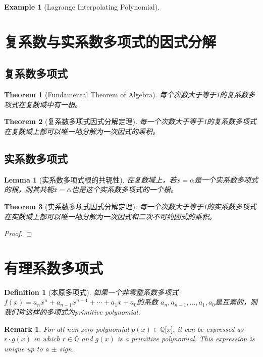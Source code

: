 \documentclass[onecolumn]{ctexart}
\newtheorem{definition}{Definition}
\newtheorem{theorem}{Theorem}
\newtheorem{lemma}{Lemma}
\newtheorem{remark}{Remark}
\newtheorem{example}{Example}
\begin{document}
\begin{example}[Lagrange Interpolating Polynomial]
  
\end{example}

\section{复系数与实系数多项式的因式分解}

\subsection{复系数多项式}

\begin{theorem}[Fundamental Theorem of Algebra]
  每个次数大于等于1的复系数多项式在复数域中有一根。
\end{theorem}

\begin{theorem}[复系数多项式因式分解定理]
  每一个次数大于等于1的复系数多项式在复数域上都可以唯一地分解为一次因式的乘积。
\end{theorem}

\subsection{实系数多项式}

\begin{lemma}[实系数多项式根的共轭性]
  在复数域上，若$x = \alpha$是一个实系数多项式的根，则其共轭$\bar{x} = \bar{\alpha}$也是这个实系数多项式的一个根。
\end{lemma}

\begin{theorem}[实系数多项式因式分解定理]
  每一个次数大于等于1的实系数多项式在实数域上都可以唯一地分解为一次因式和二次不可约因式的乘积。
\end{theorem}
\begin{proof}
  
\end{proof}

\section{有理系数多项式}
\begin{definition}[本原多项式]
  如果一个非零整系数多项式$f(x) = a_n x^n + a_{n-1} x^{n-1} + \cdots + a_1 x + a_0$的系数
  $a_n, a_{n-1}, \ldots, a_1, a_0$是互素的，则我们称这样的多项式为primitive polynomial.
\end{definition}
\begin{remark}
  For all non-zero polynomial $p(x) \in \mathbb{Q}\lbrack x \rbrack$, it can be 
  expressed as $r \cdot g(x)$ in which $r \in \mathbb{Q}$ and $g(x)$ is a 
  primitive polynomial. This expression is unique up to a $\pm$ sign.
\end{remark}
\end{document}
